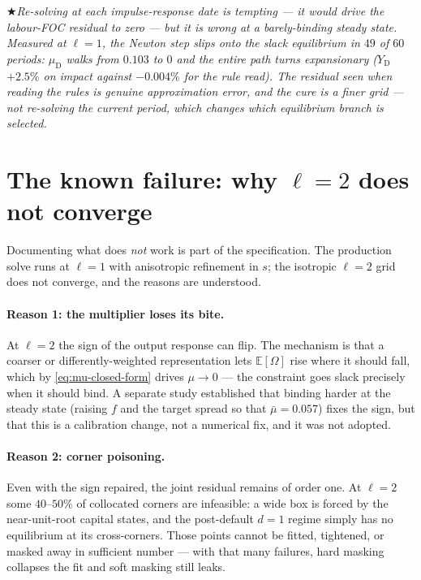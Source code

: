 \documentclass[11pt]{article}
\numberwithin{equation}{section}
\newcommand{\E}{\mathbb{E}}
\newcommand{\D}{\mathrm{D}}
\theoremstyle{definition}
\theoremstyle{plain}
\theoremstyle{remark}
\newcommand{\warn}[1]{\par\smallskip\noindent
  \textcolor{red!60!black}{$\bigstar$}\;\emph{#1}\par\smallskip}
\begin{document}
\warn{Re-solving at each impulse-response date is tempting --- it would drive the
labour-FOC residual to zero --- but it is wrong at a barely-binding steady state.
Measured at $\ell=1$, the Newton step slips onto the \emph{slack} equilibrium in $49$
of $60$ periods: $\mu_\D$ walks from $0.103$ to $0$ and the entire path turns
expansionary ($Y_\D$ $+2.5\%$ on impact against $-0.004\%$ for the rule read). The
residual seen when reading the rules is genuine approximation error, and the cure is
a finer grid --- not re-solving the current period, which changes which equilibrium
branch is selected.}

\section{\texorpdfstring{The known failure: why $\ell=2$ does not converge}
                       {The known failure: why level 2 does not converge}}
\label{sec:mu2}

Documenting what does \emph{not} work is part of the specification. The production
solve runs at $\ell=1$ with anisotropic refinement in $s$; the isotropic $\ell=2$
grid does not converge, and the reasons are understood.

\paragraph{Reason 1: the multiplier loses its bite.} At $\ell=2$ the sign of the
output response can flip. The mechanism is that a coarser or differently-weighted
representation lets $\E[\Omega]$ rise where it should fall, which by
\eqref{eq:mu-closed-form} drives $\mu\to0$ --- the constraint goes slack precisely
when it should bind. A separate study established that binding harder at the steady
state (raising $f$ and the target spread so that $\bar\mu=0.057$) fixes the sign, but
that this is a calibration change, not a numerical fix, and it was not adopted.

\paragraph{Reason 2: corner poisoning.} Even with the sign repaired, the joint
residual remains of order one. At $\ell=2$ some $40$--$50\%$ of collocated corners are
infeasible: a wide box is forced by the near-unit-root capital states, and the
post-default $d=1$ regime simply has no equilibrium at its cross-corners. Those
points cannot be fitted, tightened, or masked away in sufficient number --- with that
many failures, hard masking collapses the fit and soft masking still leaks.
\end{document}

